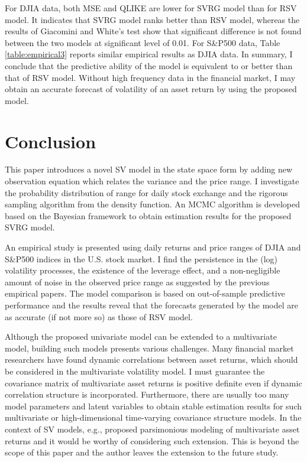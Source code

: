 \documentclass[11pt]{article}
\begin{document}
For DJIA data, both MSE and QLIKE are lower for SVRG model than for RSV model. 
It indicates that SVRG model ranks better than RSV model, whereas the results of Giacomini and White's test show that significant difference is not found between the two models at significant level of 0.01. 
For S\&P500 data, Table \ref{table:empirical3} reports similar empirical results as DJIA data. 
In summary, I conclude that the predictive ability of the model is equivalent to or better than that of RSV model. 
Without high frequency data in the financial market, I may obtain an accurate forecast of volatility of an asset return by using the proposed model. 


\newpage
\section{Conclusion}
This paper introduces a novel SV model in the state space form by adding new observation equation which relates the variance and the price range. 
I investigate the probability distribution of range for daily stock exchange and the rigorous sampling algorithm from the density function. 
An MCMC algorithm is developed based on the Bayesian framework to obtain estimation results for the proposed SVRG model. 

An empirical study is presented using daily returns and price ranges of DJIA and S\&P500 indices in the U.S. stock market. 
I find the persistence in the (log) volatility processes, the existence of the leverage effect, and a non-negligible amount of noise in the observed price range as suggested by the previous empirical papers. 
The model comparison is based on out-of-sample predictive performance 
and the results reveal that the forecasts generated by the model are as accurate (if not more so) as those of RSV model.

Although the proposed univariate model can be extended to a multivariate model, building such models presents various challenges. 
Many financial market researchers have found dynamic correlations between asset returns, which should be considered in the multivariate volatility model.  
I must guarantee the covariance matrix of multivariate asset returns is positive definite even if dynamic correlation structure is incorporated. 
Furthermore, there are usually too many model parameters and latent variables to obtain stable estimation results for such multivariate or high-dimensional time-varying covariance structure models.  
In the context of SV models, e.g., \cite{KuroseOmori(2016)} proposed parsimonious modeling of multivariate asset returns and it would be worthy of considering such extension. 
This is beyond the scope of this paper and the author leaves the extension to the future study.
\end{document}
